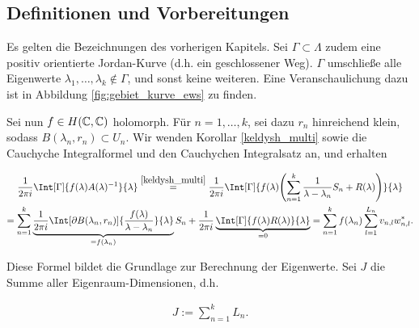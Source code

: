 \subsection*{Definitionen und Vorbereitungen}

Es gelten die Bezeichnungen des vorherigen Kapitels.
Sei $\Gamma \subset \Lambda$ zudem eine positiv orientierte Jordan-Kurve (d.h. ein geschlossener Weg).
$\Gamma$ umschließe alle Eigenwerte $\lambda_1, \dots, \lambda_k \not \in \Gamma$, und sonst keine weiteren.
Eine Veranschaulichung dazu ist in Abbildung \ref{fig:gebiet_kurve_ews} zu finden.



Sei nun $f \in H(\mathbb{C}, \mathbb{C})$ holomorph.
Für $n = 1, \dots, k$, sei dazu $r_n$ hinreichend klein, sodass $B(\lambda_n, r_n) \subset U_n$.
Wir wenden Korollar \ref{keldysh_multi} sowie die Cauchyche Integralformel und den Cauchychen Integralsatz an, und erhalten

\begin{multline} \label{eq:cauchysche_integral_formel_satz}
    \frac{1}{2 \pi i}
    \Int[\Gamma]
    {
        f(\lambda) A(\lambda)^{-1}
    }{\lambda}
    \stackrel
    {
        \ref{keldysh_multi}
    }{=}
    \frac{1}{2 \pi i}
    \Int[\Gamma]
    {
        f(\lambda)
        \pbraces
        {
            \sum_{n=1}^k
                \frac{1}{\lambda - \lambda_n} S_n
                +
                R(\lambda)
        }
    }{\lambda} \\
    =
    \sum_{n=1}^k
        \underbrace
        {
            \frac{1}{2 \pi i}
            \Int[\partial B(\lambda_n, r_n)]
            {
                \frac{f(\lambda)}{\lambda - \lambda_n}
            }{\lambda}
        }_{=f(\lambda_n)}
        S_n
    +
    \frac{1}{2 \pi i}
    \underbrace
    {
        \Int[\Gamma]
        {
            f(\lambda) R(\lambda)
        }{\lambda}
    }_{=0}
    =
    \sum_{n=1}^k
        f(\lambda_n)
        \sum_{l=1}^{L_n}
            v_{n, l} w_{n, l}^\ast.
\end{multline}

Diese Formel bildet die Grundlage zur Berechnung der Eigenwerte.
Sei $J$ die Summe aller Eigenraum-Dimensionen, d.h.

\begin{align*}
    J
    :=
    \sum_{n=1}^k
        L_n.
\end{align*}

\begin{comment}

    Für lineare Eigenwertprobleme würde weiters gelten

    \begin{align*}
        J
        \stackrel{!}{=}
        \sum_{n=1}^k
            \Def(A - \lambda_n I_N)
        =
        \dim
        \bigoplus_{n=1}^k
            \ker (A - \lambda_n I_N)
        \ll
        \dim \C^N
        =
        N.
    \end{align*}

\end{comment}

